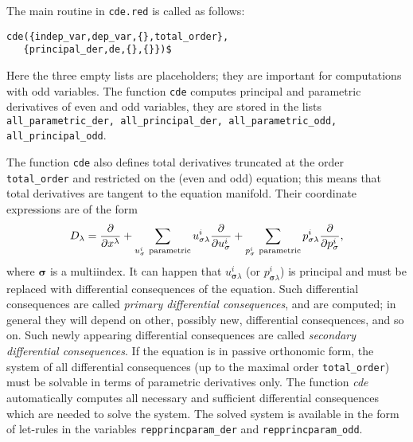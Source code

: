 The main routine in \texttt{cde.red} is called as follows:
\begin{verbatim}
cde({indep_var,dep_var,{},total_order},
   {principal_der,de,{},{}})$
\end{verbatim}
Here the three empty lists are placeholders; they are important for
computations with odd variables. The function \texttt{cde}
computes principal and parametric derivatives of even and odd variables, they
are stored in the lists \texttt{all\_parametric\_der, all\_principal\_der,
all\_parametric\_odd, all\_principal\_odd}.

The function \texttt{cde} also defines total derivatives truncated at the order
\texttt{total\_order} and restricted on the (even and odd) equation; this means
that total derivatives are tangent to the equation manifold. Their coordinate
expressions are of the form
\begin{equation}
  D_\lambda=\pd{}{x^\lambda}+\sum_{u^i_{\mathbf{\sigma}}\
    \text{parametric}}u^i_{\mathbf{\sigma}\lambda}\pd{}{u^i_{\mathbf{\sigma}}}
  + \sum_{p^i_{\mathbf{\sigma}}\
    \text{parametric}}p^i_{\mathbf{\sigma}\lambda}\pd{}{p^i_{\mathbf{\sigma}}},
\end{equation}
where $\mathbf{\sigma}$ is a multiindex.  It can happen that
$u^i_{\mathbf{\sigma}\lambda}$ (or $p^i_{\mathbf{\sigma}\lambda}$) is
principal and must be replaced with differential consequences of the equation.
Such differential consequences are called \emph{primary differential
  consequences}, and are computed; in general they will depend on other,
possibly new, differential consequences, and so on. Such newly appearing
differential consequences are called \emph{secondary differential
  consequences}. If the equation is in passive orthonomic form, the system of
all differential consequences (up to the maximal order \texttt{total\_order})
must be solvable in terms of parametric derivatives only. The function
\emph{cde} automatically computes all necessary and sufficient differential
consequences which are needed to solve the system. The solved system is
available in the form of \REDUCE let-rules in the variables
\texttt{repprincparam\_der} and \texttt{repprincparam\_odd}.

